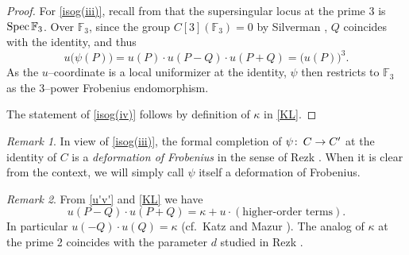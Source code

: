 \documentclass[microtype]{gtpart}     %
\theoremstyle{remark}
\newtheorem{rmk}{Remark}[section]
\theoremstyle{definition}
\def\co{\colon\thinspace}
\newcommand{\mb}[1]{\mathbb{#1}}
\newcommand{\Spec}{{\rm Spec\thinspace}}
\newcommand{\BF}{{\mb F}}
\newcommand{\K}{\kappa}
\newcommand{\isog}[1]{\fullref{prop:isog}\thinspace \eqref{isog(#1)}}
\begin{document}
\begin{proof}
 For \eqref{isog(iii)}, recall from  that the 
 supersingular locus at the prime 3 is $\Spec \BF_3$.  Over $\BF_3$, since 
 the group $C[3](\BF_3) = 0$ by Silverman \cite[V.3.1a]{AEC}, $Q$ coincides 
 with the identity, and thus 
 \[
  u\big( \psi(P) \big) = u(P) \cdot u(P-Q) \cdot u(P+Q) = \big( u(P) \big)^3.  
 \]
 As the $u$--coordinate is a local uniformizer at the identity, $\psi$ then 
 restricts to $\BF_3$ as the 3--power Frobenius endomorphism.  

 The statement of \eqref{isog(iv)} follows by definition of $\K$ in 
 \eqref{KL}.  
\end{proof}

\begin{rmk}
 In view of \isog{iii}, the formal completion of $\psi \co C \to C'$ at the 
 identity of $C$ is a {\em deformation of Frobenius} in the sense of Rezk 
 \cite[11.3]{cong}.  When it is clear from the context, we will simply call 
 $\psi$ itself a deformation of Frobenius.  
\end{rmk}

\begin{rmk}
\label{rmk:K}
 From \eqref{u'v'} and \eqref{KL} we have 
 \begin{equation}
 \label{norm}
  u(P-Q) \cdot u(P+Q) = \K + u \cdot (\text{higher-order terms}).  
 \end{equation}
 In particular $u(-Q) \cdot u(Q) = \K$ (cf.~Katz and Mazur 
 \cite[Proposition 7.5.2 and Section 7.7]{KM}).  The analog of $\K$ at the 
 prime 2 coincides with the parameter $d$ studied in Rezk 
 \cite[Section 3]{h2p2}.  
\end{rmk}
\end{document}
